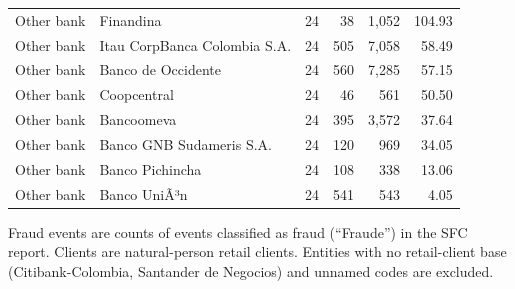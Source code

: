 \begin{table}[!htbp]
{\begin{tabular}{llrrrr}
Other bank & Finandina & 24 & 38 & 1,052 & 104.93 \\
Other bank & Itau CorpBanca Colombia S.A. & 24 & 505 & 7,058 & 58.49 \\
Other bank & Banco de Occidente & 24 & 560 & 7,285 & 57.15 \\
Other bank & Coopcentral & 24 & 46 & 561 & 50.50 \\
Other bank & Bancoomeva & 24 & 395 & 3,572 & 37.64 \\
Other bank & Banco GNB Sudameris S.A. & 24 & 120 & 969 & 34.05 \\
Other bank & Banco Pichincha & 24 & 108 & 338 & 13.06 \\
Other bank & Banco UniÃ³n & 24 & 541 & 543 & 4.05 \\
\bottomrule
\end{tabular}
}
\par\vspace{2pt}\parbox{\textwidth}{\footnotesize Fraud events are counts of events classified as fraud (``Fraude'') in the SFC report. Clients are natural-person retail clients. Entities with no retail-client base (Citibank-Colombia, Santander de Negocios) and unnamed codes are excluded.}
\end{table}